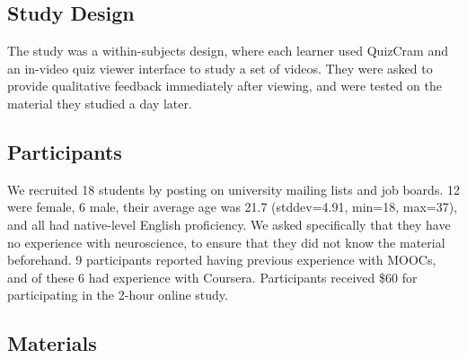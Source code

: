 \documentclass{sigchi}
\begin{document}
\subsection{Study Design}

The study was a within-subjects design, where each learner used QuizCram and an in-video quiz viewer interface to study a set of videos. They were asked to provide qualitative feedback immediately after viewing, and were tested on the material they studied a day later.

\subsection{Participants}

We recruited 18  students by posting on university mailing lists and job boards. 12 were female, 6 male, their average age was 21.7 (stddev=4.91, min=18, max=37), and all had native-level English proficiency. We asked specifically that they have no experience with neuroscience, to ensure that they did not know the material beforehand.  9 participants reported having previous experience with MOOCs, and of these 6 had experience with Coursera. Participants received \$60 for participating in the 2-hour online study.

\subsection{Materials}


\end{document}
